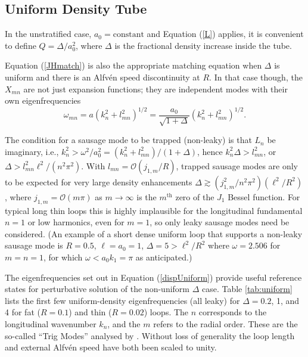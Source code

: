 \documentclass[12pt]{iopart}
\renewcommand{\L}{{\ell}}
\begin{document}
\subsection{Uniform Density Tube}
In the unstratified case, $a_0=\text{constant}$ and Equation (\ref{L}) applies, it is convenient to define $Q=\Delta/a_0^2$, where $\Delta$ is the fractional density increase inside the tube. 

Equation (\ref{JHmatch}) is also the appropriate matching equation when $\Delta$ is uniform and there is an Alfv\'en speed discontinuity at $R$. In that case though, the $X_{mn}$ are not just expansion functions; they are independent modes with their own eigenfrequencies  
\begin{equation}
\omega_{mn} = a\left(k_n^2+l_{mn}^2\right)^{1/2} = \frac{a_0}{\sqrt{1+\Delta}}\left(k_n^2+l_{mn}^2\right)^{1/2}.  \label{dispUniform}
\end{equation}

The condition for a sausage mode to be trapped (non-leaky) is that $L_n$ be imaginary, i.e., $k_n^2>\omega^2/a_0^2=(k_n^2+l_{mn}^2)/(1+\Delta)$, hence $k_n^2\Delta>l_{mn}^2$, or $\Delta > l_{mn}^2\L^2/(n^2\pi^2)$. With $l_{mn}=\mathcal{O}(j_{1,m}/R)$, trapped sausage modes are only to be expected for very large density enhancements $\Delta\gtrsim (j_{1,m}^2/n^2\pi^2)(\L^2/R^2)$, where $j_{1,m}=\mathcal{O}(m\pi)$ as $m\to\infty$ is the $m^\text{th}$ zero of the $J_1$ Bessel function. For typical long thin loops this is highly implausible for the longitudinal fundamental $n=1$ or low harmonics, even for $m=1$, so only leaky sausage modes need be considered. (An example of a short dense uniform loop that supports a non-leaky sausage mode is $R=0.5$, $\L=a_0=1$,  $\Delta=5>\L^2/R^2$ where $\omega=2.506$ for $m=n=1$, for which $\omega<a_0k_1=\pi$ as anticipated.)

The eigenfrequencies set out in Equation (\ref{dispUniform}) provide useful reference states for perturbative solution of the non-uniform $\Delta$ case. Table \ref{tab:uniform} lists the first few uniform-density eigenfrequencies (all leaky) for $\Delta=0.2$, 1, and 4 for fat ($R=0.1$) and thin ($R=0.02$) loops. The $n$ corresponds to the longitudinal wavenumber $k_n$, and the $m$ refers to the radial order. These are the so-called ``Trig Modes'' analysed by \cite{Cal85aa,Cal86aa}. Without loss of generality the loop length and external Alfv\'en speed have both been scaled to unity.
\end{document}
